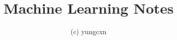 \documentclass[12pt]{article}
\begin{document}
\newcommand{\xmin}{\displaystyle\min\limits_}
\newcommand{\N}{\textit{N}}
\newcommand{\bx}{\textbf}

\thispagestyle{empty}

\title{Machine Learning Notes}
\author{(c) yungcxn}
\date{}
\maketitle


\end{document}

